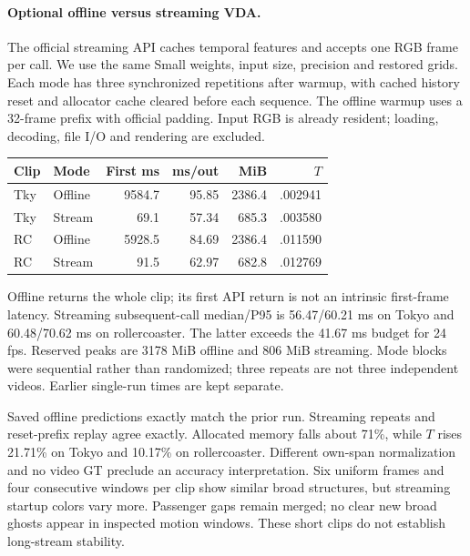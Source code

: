 \documentclass[10pt,twocolumn,letterpaper]{article}
\begin{document}
\paragraph{Optional offline versus streaming VDA.}
The official streaming API caches temporal features and accepts one RGB frame per call. We use the same Small weights, input size, precision and restored grids. Each mode has three synchronized repetitions after warmup, with cached history reset and allocator cache cleared before each sequence. The offline warmup uses a 32-frame prefix with official padding. Input RGB is already resident; loading, decoding, file I/O and rendering are excluded.

\begin{center}\begin{minipage}{\linewidth}\centering
{}
\label{tab:streaming}
\scriptsize
\begin{tabular}{llrrrr}
\toprule
Clip&Mode&First ms&ms/out&MiB&$T$\\
\midrule
Tky&Offline&9584.7&95.85&2386.4&.002941\\
Tky&Stream&69.1&57.34&685.3&.003580\\
RC&Offline&5928.5&84.69&2386.4&.011590\\
RC&Stream&91.5&62.97&682.8&.012769\\
\bottomrule
\end{tabular}
\end{minipage}\end{center}

Offline returns the whole clip; its first API return is not an intrinsic first-frame latency. Streaming subsequent-call median/P95 is 56.47/60.21 ms on Tokyo and 60.48/70.62 ms on rollercoaster. The latter exceeds the 41.67 ms budget for 24 fps. Reserved peaks are 3178 MiB offline and 806 MiB streaming. Mode blocks were sequential rather than randomized; three repeats are not three independent videos. Earlier single-run times are kept separate.

Saved offline predictions exactly match the prior run. Streaming repeats and reset-prefix replay agree exactly. Allocated memory falls about 71\%, while $T$ rises 21.71\% on Tokyo and 10.17\% on rollercoaster. Different own-span normalization and no video GT preclude an accuracy interpretation. Six uniform frames and four consecutive windows per clip show similar broad structures, but streaming startup colors vary more. Passenger gaps remain merged; no clear new broad ghosts appear in inspected motion windows. These short clips do not establish long-stream stability.
\end{document}
